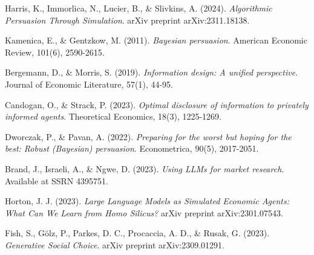 \documentclass[12pt]{article}
\theoremstyle{plain}
\theoremstyle{definition}
\theoremstyle{remark}
\begin{document}

\begin{thebibliography}{8}

Harris, K., Immorlica, N., Lucier, B., \& Slivkins, A. (2024).
\textit{Algorithmic Persuasion Through Simulation}.
arXiv preprint arXiv:2311.18138.

Kamenica, E., \& Gentzkow, M. (2011).
\textit{Bayesian persuasion}.
American Economic Review, 101(6), 2590-2615.

Bergemann, D., \& Morris, S. (2019).
\textit{Information design: A unified perspective}.
Journal of Economic Literature, 57(1), 44-95.

Candogan, O., \& Strack, P. (2023).
\textit{Optimal disclosure of information to privately informed agents}.
Theoretical Economics, 18(3), 1225-1269.

Dworczak, P., \& Pavan, A. (2022).
\textit{Preparing for the worst but hoping for the best: Robust (Bayesian) persuasion}.
Econometrica, 90(5), 2017-2051.

Brand, J., Israeli, A., \& Ngwe, D. (2023).
\textit{Using LLMs for market research}.
Available at SSRN 4395751.

Horton, J. J. (2023).
\textit{Large Language Models as Simulated Economic Agents: What Can We Learn from Homo Silicus?}
arXiv preprint arXiv:2301.07543.

Fish, S., G\"{o}lz, P., Parkes, D. C., Procaccia, A. D., \& Rusak, G. (2023).
\textit{Generative Social Choice}.
arXiv preprint arXiv:2309.01291.

\end{thebibliography}
\end{document}
